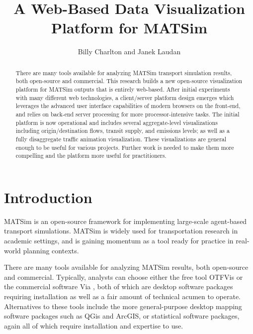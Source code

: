 \documentclass[Afour,sagev,times]{sagej}
\begin{document}

\title{A Web-Based Data Visualization Platform for MATSim}

\author{Billy Charlton and Janek Laudan}




\begin{abstract}
There are many tools available for analyzing MATSim transport
simulation results, both open-source and commercial. This research
builds a new open-source visualization platform for MATSim outputs that
is entirely web-based. After initial experiments with many different web
technologies, a client/server platform design emerges which leverages
the advanced user interface capabilities of modern browsers on the
front-end, and relies on back-end server processing for more processor-intensive
tasks. The initial platform is now operational and includes several
aggregate-level visualizations including origin/destination flows,
transit supply, and emissions levels; as well as a fully disaggregate
traffic animation visualization. These visualizations are general
enough to be useful for various projects. Further work is needed
to make them more compelling and the platform more useful for practitioners.
\end{abstract}


\maketitle

\section{Introduction}

MATSim\cite{R1} is an open-source framework for implementing large-scale agent-based transport simulations. MATSim is widely used for transportation research in academic settings, and is gaining momentum as a tool ready for practice in real-world planning contexts.

There are many tools available for analyzing MATSim results, both
open-source and commercial. Typically, analysts can choose either
the free tool OTFVis\cite{R2} or the commercial software
Via \cite{R3}, both of which are desktop software packages requiring installation as well as a fair amount of technical acumen to operate. Alternatives to these tools include the more general-purpose desktop mapping software packages such as QGis and ArcGIS, or statistical software packages, again all of which require installation and expertise to use.
\end{document}
